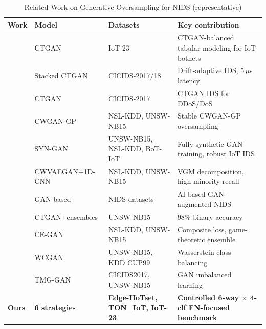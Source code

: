 ﻿\documentclass[journal]{IEEEtran}
\begin{document}
\begin{table}[!t]
\caption{Related Work on Generative Oversampling for NIDS (representative)}
\label{tab:related}
\begin{center}
\footnotesize
\setlength{\tabcolsep}{4pt}
\begin{tabular}{@{}p{}p{}p{}p{}@{}}
\toprule
\textbf{Work} & \textbf{Model} & \textbf{Datasets} & \textbf{Key contribution} \\
\midrule
\cite{habibi2023ctgan} & CTGAN & IoT-23 & CTGAN-balanced tabular modeling for IoT botnets \\
\cite{zha2025anids} & Stacked CTGAN & CICIDS-2017/18 & Drift-adaptive IDS, 5\,$\mu$s latency \\
\cite{alabsi2023ctgan} & CTGAN & CICIDS-2017 & CTGAN IDS for DDoS/DoS \\
\cite{yao2025cwgangp} & CWGAN-GP & NSL-KDD, UNSW-NB15 & Stable CWGAN-GP oversampling \\
\cite{rahman2024syngan} & SYN-GAN & UNSW-NB15, NSL-KDD, BoT-IoT & Fully-synthetic GAN training, robust IoT IDS \\
\cite{he2023cwvaegan} & CWVAEGAN\allowbreak+1D-CNN & NSL-KDD, UNSW-NB15 & VGM decomposition, high minority recall \\
\cite{park2023ainids} & GAN-based & NIDS datasets & AI-based GAN-augmented NIDS \\
\cite{soflaei2024dualctgan} & CTGAN\allowbreak+ensembles & UNSW-NB15 & 98\% binary accuracy \\
\cite{yang2025cegan} & CE-GAN & NSL-KDD, UNSW-NB15 & Composite loss, game-theoretic ensemble \\
\cite{swadi2025wcg} & WCGAN & UNSW-NB15, KDD CUP99 & Wasserstein class balancing \\
\cite{ding2024tmgggan} & TMG-GAN & CICIDS2017, UNSW-NB15 & GAN imbalanced learning \\
\textbf{Ours} & \textbf{6 strategies} & \textbf{Edge-IIoTset, TON\_IoT, IoT-23} & \textbf{Controlled 6-way $\times$ 4-clf FN-focused benchmark} \\
\bottomrule
\end{tabular}
\end{center}
\end{table}
\end{document}
